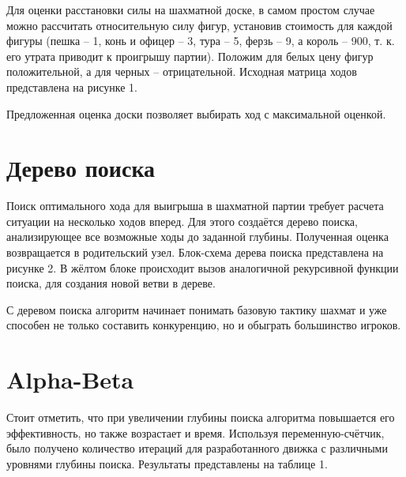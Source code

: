 \documentclass[a4paper,10pt,twoside]{article}
\begin{document}
\begin{multicols}{2}
Для оценки расстановки силы на шахматной доске, в самом простом случае можно рассчитать относительную силу фигур, установив стоимость для каждой фигуры (пешка -- 1, конь и офицер -- 3, тура -- 5, ферзь -- 9, а король -- 900, т. к. его утрата приводит к проигрышу партии). Положим для белых цену фигур положительной, а для черных -- отрицательной. Исходная матрица ходов представлена на рисунке 1.


Предложенная оценка доски позволяет выбирать ход с максимальной оценкой.



\section{Дерево поиска}
Поиск оптимального хода для выигрыша в шахматной партии требует расчета ситуации на несколько ходов вперед. Для этого создаётся дерево поиска, анализирующее все возможные ходы до заданной глубины. Полученная оценка возвращается в родительский узел. 
Блок-схема дерева поиска представлена на рисунке 2. В жёлтом блоке происходит вызов аналогичной рекурсивной функции поиска, для создания новой ветви в дереве.



С деревом поиска алгоритм начинает понимать базовую тактику шахмат и уже способен не только составить конкуренцию, но и обыграть большинство игроков.



\section{Alpha-Beta}
Стоит отметить, что при увеличении глубины поиска алгоритма повышается его эффективность, но также возрастает и время. Используя переменную-счётчик, было получено количество итераций для разработанного движка с различными уровнями глубины поиска. Результаты представлены на таблице 1.


\end{multicols}
\end{document}
